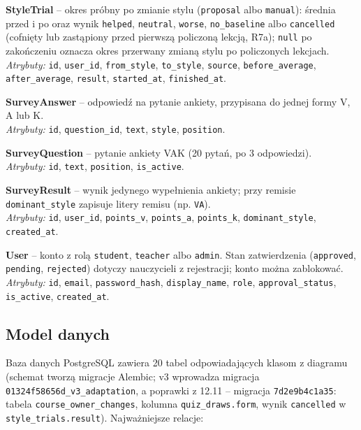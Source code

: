 \vspace{0.5em}
\textbf{StyleTrial} -- okres próbny po zmianie stylu (\texttt{proposal} albo \texttt{manual}): średnia przed i po oraz wynik \texttt{helped}, \texttt{neutral}, \texttt{worse}, \texttt{no\_baseline} albo \texttt{cancelled} (cofnięty lub zastąpiony przed pierwszą policzoną lekcją, R7a); \texttt{null} po zakończeniu oznacza okres przerwany zmianą stylu po policzonych lekcjach. \\
\textit{Atrybuty:} \texttt{id}, \texttt{user\_id}, \texttt{from\_style}, \texttt{to\_style}, \texttt{source}, \texttt{before\_average}, \texttt{after\_average}, \texttt{result}, \texttt{started\_at}, \texttt{finished\_at}.

\vspace{0.5em}
\textbf{SurveyAnswer} -- odpowiedź na pytanie ankiety, przypisana do jednej formy V, A lub K. \\
\textit{Atrybuty:} \texttt{id}, \texttt{question\_id}, \texttt{text}, \texttt{style}, \texttt{position}.

\vspace{0.5em}
\textbf{SurveyQuestion} -- pytanie ankiety VAK (20 pytań, po 3 odpowiedzi). \\
\textit{Atrybuty:} \texttt{id}, \texttt{text}, \texttt{position}, \texttt{is\_active}.

\vspace{0.5em}
\textbf{SurveyResult} -- wynik jedynego wypełnienia ankiety; przy remisie \texttt{dominant\_style} zapisuje litery remisu (np. \texttt{VA}). \\
\textit{Atrybuty:} \texttt{id}, \texttt{user\_id}, \texttt{points\_v}, \texttt{points\_a}, \texttt{points\_k}, \texttt{dominant\_style}, \texttt{created\_at}.

\vspace{0.5em}
\textbf{User} -- konto z rolą \texttt{student}, \texttt{teacher} albo \texttt{admin}. Stan zatwierdzenia (\texttt{approved}, \texttt{pending}, \texttt{rejected}) dotyczy nauczycieli z rejestracji; konto można zablokować. \\
\textit{Atrybuty:} \texttt{id}, \texttt{email}, \texttt{password\_hash}, \texttt{display\_name}, \texttt{role}, \texttt{approval\_status}, \texttt{is\_active}, \texttt{created\_at}.

\subsection{Model danych}

Baza danych PostgreSQL zawiera 20 tabel odpowiadających klasom z diagramu (schemat tworzą migracje Alembic; v3 wprowadza migracja \texttt{01324f58656d\_v3\_adaptation}, a poprawki z 12.11 -- migracja \texttt{7d2e9b4c1a35}: tabela \texttt{course\_owner\_changes}, kolumna \texttt{quiz\_draws.form}, wynik \texttt{cancelled} w \texttt{style\_trials.result}). Najważniejsze relacje:

